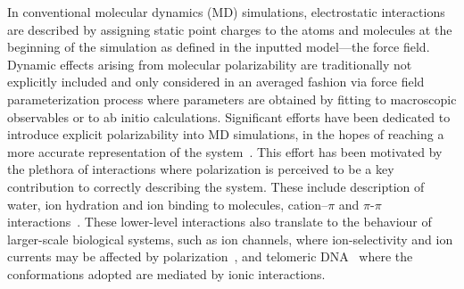 \documentclass[journal=jacsat,manuscript=article,layout=singlecolumn]{achemso}
\begin{document}
 

In conventional molecular dynamics (MD) simulations, electrostatic interactions are described by assigning static point charges to the atoms and molecules at the beginning of the simulation as defined in the inputted model---the force field. Dynamic effects arising from molecular polarizability are traditionally not explicitly included and only considered in an averaged fashion via force field parameterization process where parameters are obtained by fitting to macroscopic observables or to ab initio calculations. Significant efforts have been dedicated to introduce explicit polarizability into MD simulations, in the hopes of reaching a more accurate representation of the system~\cite{Thole1981,ando2001stable,Grossfield2003,
lamoreux2003,Antila2013 ,Lemkul2016, baker2015polarizable,jing2019polarizable }. This effort has been motivated by the plethora of interactions where polarization is perceived to be a key contribution to correctly describing the system. These include description of water, ion hydration and ion binding to molecules, cation--$\pi$ and $\pi$-$\pi$ interactions~\cite{inakollu2020polarisable}. These lower-level interactions also translate to the behaviour of larger-scale biological systems, such as ion channels, where ion-selectivity and ion currents may be affected by polarization~\cite{roux2011ion, klesse2020induced, prajapati2020computational,Yue2022}, and telomeric DNA~\cite{Salsbury22} where the conformations adopted are mediated by ionic interactions.
\end{document}
